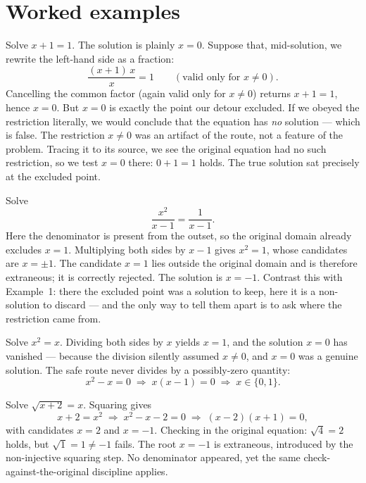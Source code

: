 \documentclass{essay}
\begin{document}
\section{Worked examples}

\begin{example}
  Solve $x + 1 = 1$. The solution is plainly $x = 0$. Suppose that, mid-solution, we rewrite
  the left-hand side as a fraction:
  \[
    \frac{(x+1)\,x}{x} = 1 \qquad (\text{valid only for } x \neq 0).
  \]
  Cancelling the common factor (again valid only for $x \neq 0$) returns $x + 1 = 1$, hence
  $x = 0$. But $x = 0$ is exactly the point our detour excluded. If we obeyed the restriction
  literally, we would conclude that the equation has \emph{no} solution --- which is false.
  The restriction $x \neq 0$ was an artifact of the route, not a feature of the problem.
  Tracing it to its source, we see the original equation had no such restriction, so we test
  $x=0$ there: $0 + 1 = 1$ holds. The true solution sat precisely at the excluded point.
\end{example}

\begin{example}
  Solve
  \[
    \frac{x^2}{x-1} = \frac{1}{x-1}.
  \]
  Here the denominator is present from the outset, so the original domain already excludes
  $x = 1$. Multiplying both sides by $x-1$ gives $x^2 = 1$, whose candidates are $x = \pm 1$.
  The candidate $x = 1$ lies outside the original domain and is therefore extraneous; it is
  correctly rejected. The solution is $x = -1$. Contrast this with Example~1: there the
  excluded point was a solution to keep, here it is a non-solution to discard --- and the only
  way to tell them apart is to ask where the restriction came from.
\end{example}

\begin{example}
  Solve $x^2 = x$. Dividing both sides by $x$ yields $x = 1$, and the solution $x = 0$ has
  vanished --- because the division silently assumed $x \neq 0$, and $x = 0$ was a genuine
  solution. The safe route never divides by a possibly-zero quantity:
  \[
    x^2 - x = 0 \;\Longrightarrow\; x(x-1) = 0 \;\Longrightarrow\; x \in \{0, 1\}.
  \]
\end{example}

\begin{example}
  Solve $\sqrt{x+2} = x$. Squaring gives
  \[
    x + 2 = x^2 \;\Longrightarrow\; x^2 - x - 2 = 0 \;\Longrightarrow\; (x-2)(x+1) = 0,
  \]
  with candidates $x = 2$ and $x = -1$. Checking in the original equation: $\sqrt{4} = 2$
  holds, but $\sqrt{1} = 1 \neq -1$ fails. The root $x = -1$ is extraneous, introduced by the
  non-injective squaring step. No denominator appeared, yet the same check-against-the-original
  discipline applies.
\end{example}
\end{document}
